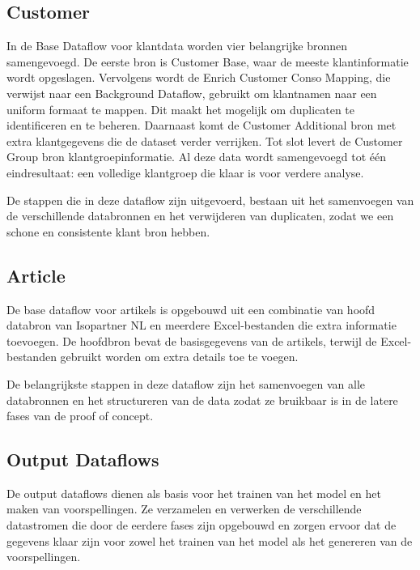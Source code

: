 \subsection*{Customer}

In de Base Dataflow voor klantdata worden vier belangrijke bronnen samengevoegd. De eerste bron is Customer Base, waar de meeste klantinformatie wordt opgeslagen. Vervolgens wordt de Enrich Customer Conso Mapping, die verwijst naar een Background Dataflow, gebruikt om klantnamen naar een uniform formaat te mappen. Dit maakt het mogelijk om duplicaten te identificeren en te beheren. Daarnaast komt de Customer Additional bron met extra klantgegevens die de dataset verder verrijken. Tot slot levert de Customer Group bron klantgroepinformatie. Al deze data wordt samengevoegd tot één eindresultaat: een volledige klantgroep die klaar is voor verdere analyse.

\vspace{1 em}

De stappen die in deze dataflow zijn uitgevoerd, bestaan uit het samenvoegen van de verschillende databronnen en het verwijderen van duplicaten, zodat we een schone en consistente klant bron hebben.

\subsection*{Article}


De base dataflow voor artikels is opgebouwd uit een combinatie van hoofd databron van Isopartner NL en meerdere Excel-bestanden die extra informatie toevoegen. De hoofdbron bevat de basisgegevens van de artikels, terwijl de Excel-bestanden gebruikt worden om extra details toe te voegen.

\vspace{1 em}

De belangrijkste stappen in deze dataflow zijn het samenvoegen van alle databronnen en het structureren van de data zodat ze bruikbaar is in de latere fases van de proof of concept.

\newpage

\subsection{Output Dataflows}

De output dataflows dienen als basis voor het trainen van het model en het maken van voorspellingen. Ze verzamelen en verwerken de verschillende datastromen die door de eerdere fases zijn opgebouwd en zorgen ervoor dat de gegevens klaar zijn voor zowel het trainen van het model als het genereren van de voorspellingen.

